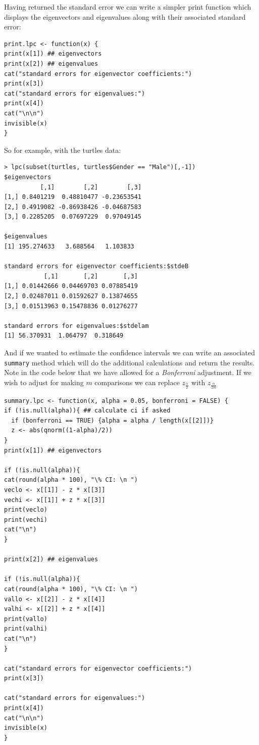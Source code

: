 Having returned the standard error we can write a simpler print function which displays the eigenvectors and eigenvalues along with their associated standard error:
\onehalfspacing
\begin{verbatim}
print.lpc <- function(x) {
print(x[1]) ## eigenvectors
print(x[2]) ## eigenvalues
cat("standard errors for eigenvector coefficients:")
print(x[3])
cat("standard errors for eigenvalues:")
print(x[4])
cat("\n\n")
invisible(x)
}
\end{verbatim}
\onehalfspacing

So for example, with the turtles data:
\singlespacing
\begin{verbatim}
> lpc(subset(turtles, turtles$Gender == "Male")[,-1])
$eigenvectors
          [,1]        [,2]        [,3]
[1,] 0.8401219  0.48810477 -0.23653541
[2,] 0.4919082 -0.86938426 -0.04687583
[3,] 0.2285205  0.07697229  0.97049145

$eigenvalues
[1] 195.274633   3.688564   1.103833

standard errors for eigenvector coefficients:$stdeB
           [,1]       [,2]       [,3]
[1,] 0.01442666 0.04469703 0.07885419
[2,] 0.02487011 0.01592627 0.13874655
[3,] 0.01513963 0.15478836 0.01276277

standard errors for eigenvalues:$stdelam
[1] 56.370931  1.064797  0.318649

\end{verbatim}
\onehalfspacing

And if we wanted to estimate the confidence intervals we can write an associated \verb+summary+ method which will do the additional calculations and return the results.   Note in the code below that we have allowed for a \emph{Bonferroni} adjustment.   If we wish to adjust for making $m$ comparisons we can replace $z_{\frac{\alpha}{2}}$ with $z_{\frac{\alpha}{2m}}$  

\singlespacing
\begin{verbatim}
summary.lpc <- function(x, alpha = 0.05, bonferroni = FALSE) {
if (!is.null(alpha)){ ## calculate ci if asked
  if (bonferroni == TRUE) {alpha = alpha / length(x[[2]])}
  z <- abs(qnorm((1-alpha)/2))
}
print(x[1]) ## eigenvectors

if (!is.null(alpha)){
cat(round(alpha * 100), "\% CI: \n ")
veclo <- x[[1]] - z * x[[3]]
vechi <- x[[1]] + z * x[[3]]
print(veclo)
print(vechi)
cat("\n")
} 

print(x[2]) ## eigenvalues

if (!is.null(alpha)){
cat(round(alpha * 100), "\% CI: \n ")
vallo <- x[[2]] - z * x[[4]]
valhi <- x[[2]] + z * x[[4]]
print(vallo)
print(valhi)
cat("\n")
} 

cat("standard errors for eigenvector coefficients:")
print(x[3])

cat("standard errors for eigenvalues:")
print(x[4])
cat("\n\n")
invisible(x)
}
\end{verbatim}
\onehalfspacing

